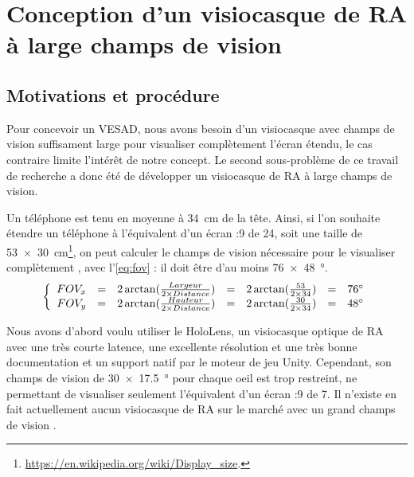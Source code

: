 \chapter{Conception d'un visiocasque de RA à large champs de vision}
\label{ch:methodology}

\section{Motivations et procédure}
Pour concevoir un VESAD, nous avons besoin d'un visiocasque avec champs de vision suffisament large pour visualiser complètement l'écran étendu, le cas contraire limite l'intérêt de notre concept. Le second sous-problème de ce travail de recherche a donc été de développer un visiocasque de RA à large champs de vision.

Un téléphone est tenu en moyenne à \SI{34}{\cm} \citep{Bababekova2011} de la tête. Ainsi, si l'on souhaite étendre un téléphone à l'équivalent d'un écran {:9} de \SI{24}{\inch}, soit une taille de \SI{53x30}{\cm}\footnote{\url{https://en.wikipedia.org/wiki/Display_size}.}, on peut calculer le champs de vision nécessaire pour le visualiser complètement , avec l'\autoref{eq:fov} : il doit être d'au moins \SI{76x48}{\degree}.
\begin{equation}
  \label{eq:fov}
  \left \{
  \begin{array}{r c c c c c l}
    FOV_x & = & 2 \arctan (\frac{Largeur}{2 \times Distance}) & = & 2 \arctan (\frac{53}{2 \times 34}) & = & \ang{76}\\
    FOV_y & = & 2 \arctan (\frac{Hauteur}{2 \times Distance}) & = & 2 \arctan (\frac{30}{2 \times 34}) & = & \ang{48}
  \end{array}
  \right .
\end{equation}


Nous avons d'abord voulu utiliser le HoloLens, un visiocasque optique de RA avec une très courte latence, une excellente résolution et une très bonne documentation et un support natif par le moteur de jeu Unity. Cependant, son champs de vision de \SI{30x17.5}{\degree} pour chaque oeil \citep{Kreylos2015} est trop restreint, ne permettant de visualiser seulement l'équivalent d'un écran {:9} de \SI{7}{\inch}. Il n'existe en fait actuellement aucun visiocasque de RA sur le marché  avec un grand champs de vision \citep{Millette2016}.


